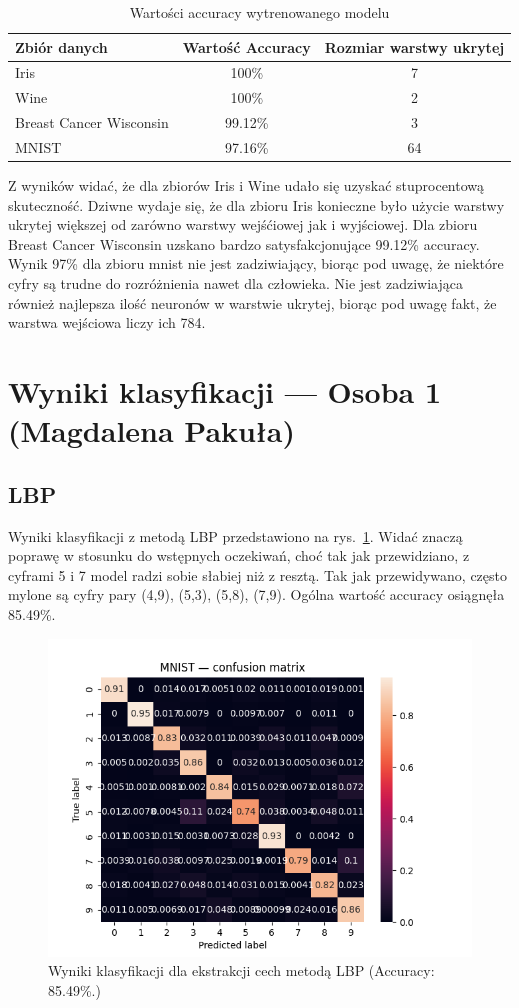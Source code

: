 \documentclass[10pt]{article}
\begin{document}
\begin{table}[H]\centering
    \begin{tabular}{lcc}
        \toprule
        Zbiór danych            & Wartość Accuracy & Rozmiar warstwy ukrytej \\
        \midrule
        Iris                    & 100\%            & 7                       \\
        Wine                    & 100\%            & 2                       \\
        Breast Cancer Wisconsin & 99.12\%          & 3                       \\
        MNIST                   & 97.16\%          & 64                      \\
        \bottomrule
    \end{tabular}
    \caption{Wartości accuracy wytrenowanego modelu}
\end{table}

Z wyników widać, że dla zbiorów Iris i Wine udało się uzyskać stuprocentową skuteczność.
Dziwne wydaje się, że dla zbioru Iris konieczne było użycie warstwy ukrytej większej od zarówno warstwy wejśćiowej jak i wyjściowej.
Dla zbioru Breast Cancer Wisconsin uzskano bardzo satysfakcjonujące 99.12\% accuracy.
Wynik 97\% dla zbioru mnist nie jest zadziwiający, biorąc pod uwagę, że niektóre cyfry są trudne do rozróżnienia nawet dla człowieka.
Nie jest zadziwiająca również najlepsza ilość neuronów w warstwie ukrytej, biorąc pod uwagę fakt, że warstwa wejściowa liczy ich 784.

\pagebreak

\section{Wyniki klasyfikacji --- Osoba 1 (Magdalena Pakuła)}
\subsection*{LBP}
Wyniki klasyfikacji z metodą LBP przedstawiono na rys.~\ref{fig:lbp-cm}.
Widać znaczą poprawę w stosunku do wstępnych oczekiwań, choć tak jak przewidziano, z cyframi 5 i 7 model radzi sobie słabiej niż z resztą.
Tak jak przewidywano, często mylone są cyfry pary (4,9), (5,3), (5,8), (7,9).
Ogólna wartość accuracy osiągnęła 85.49\%.

\begin{figure}[H]
    \centering
    \includegraphics[width=.5\linewidth]{img/LBP/img}
    \caption{Wyniki klasyfikacji dla ekstrakcji cech metodą LBP (Accuracy: 85.49\%.)}\label{fig:lbp-cm}
\end{figure}
\end{document}
